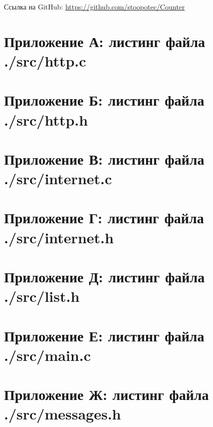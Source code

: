 \documentclass{article}
\begin{document}
    Ссылка на GitHub: \href{https://github.com/stoopotec/Counter}{https://github.com/stoopotec/Counter}

    
    \newpage



    \section{Приложение А: листинг файла ./src/http.c}
    

    \section{Приложение Б: листинг файла ./src/http.h}
    

    \section{Приложение В: листинг файла ./src/internet.c}
    

    \section{Приложение Г: листинг файла ./src/internet.h}
    

    \section{Приложение Д: листинг файла ./src/list.h}
    

    \section{Приложение Е: листинг файла ./src/main.c}
    

    \section{Приложение Ж: листинг файла ./src/messages.h}
    
\end{document}
